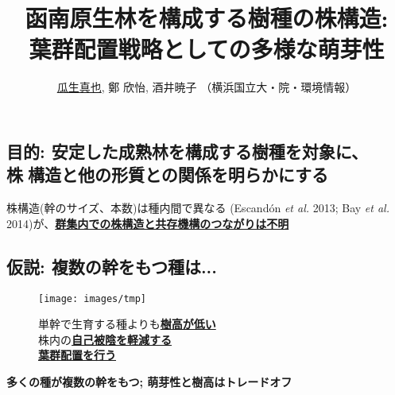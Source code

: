 \documentclass[a0, 36pt, plainboxedsections]{sciposter} %
\title{\textcolor{Blue1}{函南原生林を構成する樹種の株構造:\\\vspace{-0.2em} 葉群配置戦略としての多様な萌芽性}}
\author{\underline{瓜生真也}, 鄭 欣怡, 酒井暁子 （横浜国立大・院・環境情報） \normalsize{\faEnvelope \hspace{0.02em} \fontspec{HelveticaNeue-Italic}{suika1127@gmail.com}}}
\begin{document}
\maketitle
\vspace{-2em}
\begin{multicols}{2}
\begin{mdframed}[style=section.frame]
  \flushleft\LARGE\textbf{\color{white}{はじめに}}
\end{mdframed}

\vspace{-0.6em}\subsection*{目的: 安定した成熟林を構成する樹種を対象に、\\\hspace*{6em}株構造と他の形質との関係を明らかにする}

株構造(幹のサイズ、本数)は種内間で異なる {\tiny(Escandón \textit{et al.} 2013; Bay \textit{et al.} 2014)}が、\textbf{\underline{群集内での株構造と共存機構のつながりは不明}}

\subsection*{仮説: 複数の幹をもつ種は...}

\vspace{-0.6em}\begin{figure}
 \begin{minipage}{0.4\hsize}
  \centering
   \texttt{[image: images/tmp]}  
 \end{minipage}
 \begin{minipage}{0.6\hsize}
  単幹で生育する種よりも\underline{\textbf{樹高が低い}}\\
  株内の\underline{\textbf{自己被陰を軽減する}}\\\hspace*{10.5em}\underline{\textbf{葉群配置を行う}}
 \end{minipage}
\end{figure}

\columnbreak
\begin{mdframed}[style=conclusion.frame,frametitle={\textbf{\Large{萌芽性は樹高と背反的に進化しており、\\\hspace*{1em}群集の中に多様な萌芽性の種が存在する}}}]
  \vspace{0.4em}
  \flushleft
  \normalsize{
  \textbf{多くの種が複数の幹をもつ; 萌芽性と樹高はトレードオフ}
  
}
\end{mdframed}
\end{multicols}
\end{document}
